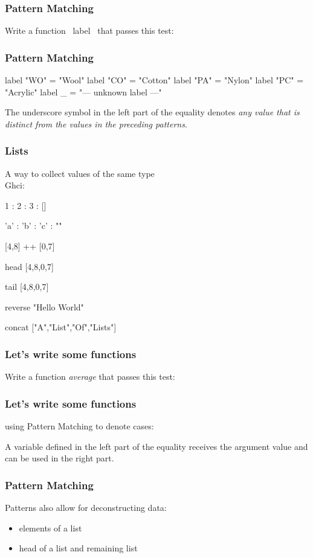 \documentclass[11pt,xcolor={dvipsnames}]{beamer}
\newcommand{\tc}{\textcolor}
\newcommand{\key}[1]{\tc{orange}{#1}}
\newcommand{\rk}{\enskip{\key{$\hookleftarrow$}}}
\newcommand{\vs}{\vspace{1em}}
\newcommand{\lstH}[1]{}
\newcommand{\lstT}[1]{}
\begin{document}
\begin{frame}[fragile]
\frametitle{Pattern Matching}
Write a function ~label~ that passes this test:

\lstT{009}
\end{frame}
\begin{frame}[fragile]
\frametitle{Pattern Matching}
\begin{haskell}
label "WO" = "Wool"
label "CO" = "Cotton"
label "PA" = "Nylon"
label "PC" = "Acrylic"
label   _  = "--- unknown label ---"
\end{haskell}
The underscore symbol in the left part of the equality denotes \emph{any value that is distinct from the values in the preceding patterns}.
\end{frame}
\begin{frame}[fragile]
\frametitle{Lists}
A way to collect values of the same type\\
Ghci:
\begin{term}
1 : 2 : 3 : []\rk

'a' : 'b' : 'c' : ""\rk

[4,8] ++ [0,7]\rk

head [4,8,0,7]\rk

tail [4,8,0,7]\rk

reverse "Hello World"\rk

concat ["A","List","Of","Lists"]\rk
\end{term}
\end{frame}
\begin{frame}[fragile]
\frametitle{Let's write some functions}
Write a function \emph{average} that passes this test:
\vs
\lstT{012}
\end{frame}
\begin{frame}[fragile]
\frametitle{Let's write some functions}
using Pattern Matching to denote cases: 
\vs
\lstH{013}
\vs
A variable defined in the left part of the equality receives the argument value and can be used in the right part.
\end{frame}
\begin{frame}[fragile]
\frametitle{Pattern Matching}
\lstH{014}
\vs
Patterns also allow for deconstructing data:
\begin{itemize}
\item elements of a list
\item head of a list and remaining list 
\end{itemize}
\end{frame}
\end{document}
